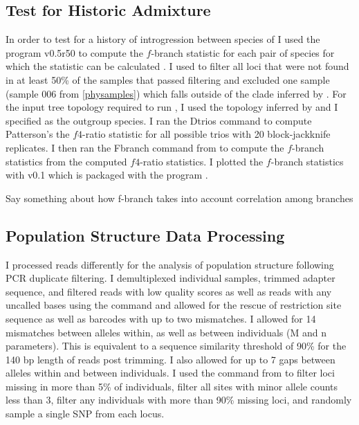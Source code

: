 \subsection{Test for Historic Admixture}
In order to test for a history of introgression between species of \anaxyrus I used the 
program \dsuite v0.5r50 \parencite{malinsky2021} to compute the $f$-branch 
statistic for each pair of \anaxyrus species for which the statistic 
can be calculated \parencite{reich2009,malinsky2018}. 
I used \pyrad to filter all loci that were not found in at least 50\% of the 
samples that passed filtering and excluded one \fowl sample 
(sample 006 from \ref{physamples}) which falls outside of the \fowl clade 
inferred by \iqtree.
For the input tree topology required to run \dsuite, I used the topology inferred
by \phycoeval and I specified \nebulifer as the outgroup species.
I ran the \dsuite Dtrios command to compute Patterson's the $f4$-ratio
statistic for all possible trios with 20 block-jackknife replicates.
I then ran the Fbranch command from \dsuite to compute the $f$-branch statistics 
from the computed $f4$-ratio statistics. 
I plotted the $f$-branch statistics with \dtools v0.1 which is packaged with
the \dsuite program \parencite{malinsky2021}. 

Say something about how f-branch takes into account correlation among branches

\subsection{Population Structure Data Processing}
I processed reads differently for the analysis of population structure
following PCR duplicate filtering. 
I demultiplexed individual samples, trimmed adapter sequence, and filtered 
reads with low quality scores as well as reads with any uncalled bases using the 
\processradtags command and allowed for the rescue of restriction site sequence 
as well as barcodes with up to two mismatches.  
I allowed for 14 mismatches between alleles within, as well as between individuals
(M and n parameters). This is equivalent to a sequence similarity threshold of   
90\% for the 140 bp length of reads post trimming. 
I also allowed for up to 7 gaps between alleles within and between individuals.
I used the \populations command from \stacks to filter loci missing in more than   
5\% of individuals, filter all sites with minor allele counts less than 3, filter 
any individuals with more than 90\% missing loci, and randomly sample a single
SNP from each locus.

